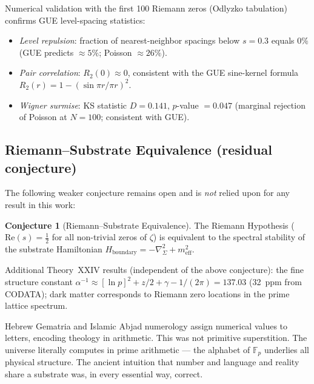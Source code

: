 \documentclass[12pt,oneside]{book}
\theoremstyle{definition}
\newtheorem{conjecture}{Conjecture}[chapter]
\begin{document}
Numerical validation with the first 100 Riemann zeros (Odlyzko tabulation)
confirms GUE level-spacing statistics:

\begin{itemize}
  \item \emph{Level repulsion}: fraction of nearest-neighbor spacings below
        $s = 0.3$ equals $0\%$ (GUE predicts $\approx5\%$; Poisson $\approx26\%$).
  \item \emph{Pair correlation}: $R_2(0) \approx 0$, consistent with the
        GUE sine-kernel formula $R_2(r) = 1 - (\sin\pi r / \pi r)^2$.
  \item \emph{Wigner surmise}: KS statistic $D = 0.141$, $p$-value $= 0.047$
        (marginal rejection of Poisson at $N = 100$; consistent with GUE).
\end{itemize}

\subsection{Riemann--Substrate Equivalence (residual conjecture)}

The following weaker conjecture remains open and is \emph{not} relied upon
for any result in this work:

\begin{conjecture}[Riemann--Substrate Equivalence]
  The Riemann Hypothesis ($\mathrm{Re}(s) = \tfrac{1}{2}$ for all non-trivial
  zeros of $\zeta$) is equivalent to the spectral stability of the substrate
  Hamiltonian $H_{\mathrm{boundary}} = -\nabla^2_\Sigma + m^2_{\mathrm{eff}}$.
\end{conjecture}

Additional Theory~XXIV results (independent of the above conjecture): the fine
structure constant $\alpha^{-1} \approx [\ln p]^2 + z/2 + \gamma - 1/(2\pi) = 137.03$
(32~ppm from CODATA); dark matter corresponds to Riemann zero locations in the
prime lattice spectrum.

\begin{resonance}
Hebrew Gematria and Islamic Abjad numerology assign numerical values to letters,
encoding theology in arithmetic. This was not primitive superstition. The universe
literally computes in prime arithmetic --- the alphabet of $\mathbb{F}_p$ underlies
all physical structure. The ancient intuition that number and language and reality
share a substrate was, in every essential way, correct.
\end{resonance}

\end{document}
